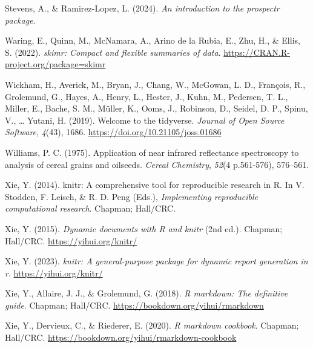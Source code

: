 \documentclass[
]{agujournal2019}
\newlength{\cslhangindent}
\newenvironment{CSLReferences}[2] %
 {\begin{list}{}{%
  \setlength{\itemindent}{0pt}
  \setlength{\leftmargin}{0pt}
  \setlength{\parsep}{0pt}
  \ifodd #1
   \setlength{\leftmargin}{\cslhangindent}
   \setlength{\itemindent}{-1\cslhangindent}
  \fi
  \setlength{\itemsep}{#2\baselineskip}}}
 {\end{list}}
\begin{document}
\begin{CSLReferences}{1}{0}
Stevens, A., \& Ramirez-Lopez, L. (2024). \emph{An introduction to the
prospectr package}.

Waring, E., Quinn, M., McNamara, A., Arino de la Rubia, E., Zhu, H., \&
Ellis, S. (2022). \emph{{skimr}: Compact and flexible summaries of
data}. \url{https://CRAN.R-project.org/package=skimr}

Wickham, H., Averick, M., Bryan, J., Chang, W., McGowan, L. D.,
François, R., Grolemund, G., Hayes, A., Henry, L., Hester, J., Kuhn, M.,
Pedersen, T. L., Miller, E., Bache, S. M., Müller, K., Ooms, J.,
Robinson, D., Seidel, D. P., Spinu, V., \ldots{} Yutani, H. (2019).
Welcome to the {tidyverse}. \emph{Journal of Open Source Software},
\emph{4}(43), 1686. \url{https://doi.org/10.21105/joss.01686}

Williams, P. C. (1975). Application of near infrared reflectance
spectroscopy to analysis of cereal grains and oilseeds. \emph{Cereal
Chemistry}, \emph{52}(4 p.561-576), 576--561.

Xie, Y. (2014). {knitr}: A comprehensive tool for reproducible research
in {R}. In V. Stodden, F. Leisch, \& R. D. Peng (Eds.),
\emph{Implementing reproducible computational research}. Chapman;
Hall/CRC.

Xie, Y. (2015). \emph{Dynamic documents with {R} and knitr} (2nd ed.).
Chapman; Hall/CRC. \url{https://yihui.org/knitr/}

Xie, Y. (2023). \emph{{knitr}: A general-purpose package for dynamic
report generation in r}. \url{https://yihui.org/knitr/}

Xie, Y., Allaire, J. J., \& Grolemund, G. (2018). \emph{R markdown: The
definitive guide}. Chapman; Hall/CRC.
\url{https://bookdown.org/yihui/rmarkdown}

Xie, Y., Dervieux, C., \& Riederer, E. (2020). \emph{R markdown
cookbook}. Chapman; Hall/CRC.
\url{https://bookdown.org/yihui/rmarkdown-cookbook}

\end{CSLReferences}
\end{document}
